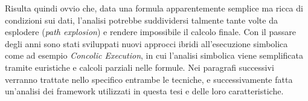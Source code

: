 \documentclass[Lau, oneside]{sapthesis}%
\begin{document}
\newline
Risulta quindi ovvio che, data una formula apparentemente semplice ma ricca di condizioni sui dati, l'analisi potrebbe suddividersi talmente tante volte da esplodere (\textit{path explosion}) e rendere impossibile il calcolo finale.
\newline \newline
Con il passare degli anni sono stati sviluppati nuovi approcci ibridi all'esecuzione simbolica come ad esempio \textit{Concolic Execution}, in cui l'analisi simbolica viene semplificata tramite euristiche e calcoli parziali nelle formule.
\newline \newline
Nei paragrafi successivi verranno trattate nello specifico entrambe le tecniche, e successivamente fatta un'analisi dei framework utilizzati in questa tesi e delle loro caratteristiche.



\newpage
\end{document}
